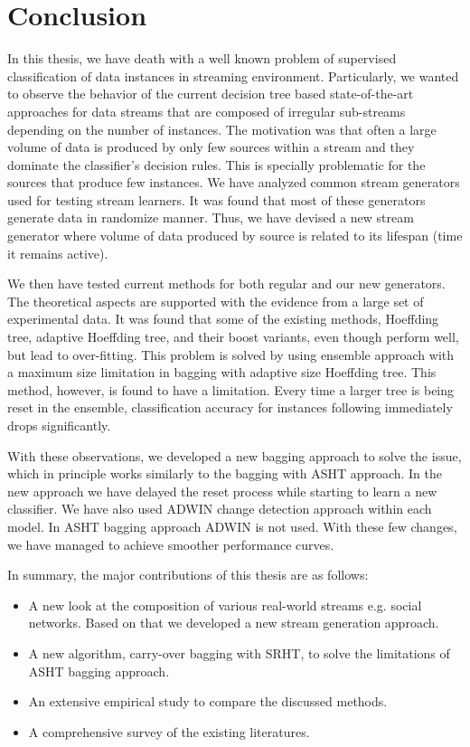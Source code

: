 \chapter{Conclusion}
\label{chp:conclude}

In this thesis, we have death with a well known problem of supervised classification of data instances in streaming environment. Particularly, we wanted to observe the behavior of the current decision tree based state-of-the-art approaches for data streams that are composed of irregular sub-streams depending on the number of instances. The motivation was that often a large volume of data is produced by only few sources within a stream and they dominate the classifier's decision rules. This is specially problematic for the sources that produce few instances. We have analyzed common stream generators used for testing stream learners. It was found that most of these generators generate data in randomize manner. Thus, we have devised a new stream generator where volume of data produced by source is  related to its lifespan (time it remains active). 

We then have tested current methods for both regular and our new generators. The theoretical aspects are supported with the evidence from a large set of experimental data. It was found that some of the existing methods, Hoeffding tree, adaptive Hoeffding tree, and their boost variants, even though perform well, but lead  to over-fitting. This problem is solved by using ensemble approach with a maximum size limitation in bagging with adaptive size Hoeffding tree. This method, however, is found to have a limitation. Every time a larger tree is being reset in the ensemble, classification accuracy for instances following immediately drops significantly. 

With these observations, we developed a new bagging approach  to solve the issue, which in principle works similarly to the bagging with ASHT approach. In the new approach we have delayed the reset process while starting to learn a new classifier. We have also used ADWIN change detection approach within each model. In ASHT bagging approach ADWIN is not used. With these few changes, we have managed to achieve smoother performance curves.

In summary, the major contributions of this thesis are as follows:

\begin{itemize}
    \item A new look at the composition of various real-world streams e.g. social networks. Based on that we developed a new stream generation approach.
    
    \item A new algorithm, carry-over bagging with SRHT, to solve the limitations of ASHT bagging approach.
    
    \item An extensive empirical study to compare the discussed methods.
    
    \item A comprehensive survey of the existing literatures.
\end{itemize}

